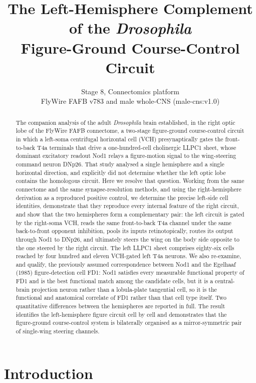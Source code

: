 \documentclass[11pt]{article}
\title{\bfseries The Left-Hemisphere Complement of the \textit{Drosophila}\\
Figure-Ground Course-Control Circuit}
\author{Stage 8, Connectomics platform \\ \small FlyWire FAFB v783 and male whole-CNS (male-cns:v1.0)}
\date{}
\begin{document}
\maketitle

\begin{abstract}
\noindent
The companion analysis of the adult \textit{Drosophila} brain established, in the right optic
lobe of the FlyWire FAFB connectome, a two-stage figure-ground course-control circuit in which a
left-soma centrifugal horizontal cell (VCH) presynaptically gates the front-to-back T4a terminals
that drive a one-hundred-cell cholinergic LLPC1 sheet, whose dominant excitatory readout Nod1
relays a figure-motion signal to the wing-steering command neuron DNp26. That study analysed a
single hemisphere and a single horizontal direction, and explicitly did not determine whether the
left optic lobe contains the homologous circuit. Here we resolve that question. Working from the
same connectome and the same synapse-resolution methods, and using the right-hemisphere
derivation as a reproduced positive control, we determine the precise left-side cell identities,
demonstrate that they reproduce every internal feature of the right circuit, and show that the
two hemispheres form a complementary pair: the left circuit is gated by the right-soma VCH,
reads the same front-to-back T4a channel under the same back-to-front opponent inhibition,
pools its inputs retinotopically, routes its output through Nod1 to DNp26, and ultimately steers
the wing on the body side opposite to the one steered by the right circuit. The left LLPC1 sheet
comprises eighty-six cells reached by four hundred and eleven VCH-gated left T4a neurons. We
also re-examine, and qualify, the previously assumed correspondence between Nod1 and the
Egelhaaf (1985) figure-detection cell FD1: Nod1 satisfies every measurable functional property of
FD1 and is the best functional match among the candidate cells, but it is a central-brain
projection neuron rather than a lobula-plate tangential cell, so it is the functional and
anatomical correlate of FD1 rather than that cell type itself. Two quantitative differences
between the hemispheres are reported in full. The result identifies the left-hemisphere figure
circuit cell by cell and demonstrates that the figure-ground course-control system is bilaterally
organised as a mirror-symmetric pair of single-wing steering channels.
\end{abstract}

\section{Introduction}
\end{document}

